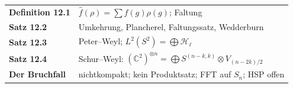\begin{merksatz}
\begin{center}
\renewcommand{\arraystretch}{1.5}
\begin{tabular}{@{}P{3.0cm}P{5.6cm}@{}}
\toprule
\textbf{Definition 12.1} & $\hat f(\rho) = \sum f(g)\rho(g)$; Faltung\\
\textbf{Satz 12.2} & Umkehrung, Plancherel, Faltungssatz, Wedderburn\\
\textbf{Satz 12.3} & Peter--Weyl; $L^{2}(S^{2}) = \bigoplus\mathcal H_\ell$\\
\textbf{Satz 12.4} & Schur--Weyl: $(\mathbb C^{2})^{\otimes n} = \bigoplus S^{(n-k,k)}\otimes V_{(n-2k)/2}$\\
\textbf{Der Bruchfall} & nichtkompakt; kein Produktsatz; FFT auf $S_n$; HSP offen\\
\bottomrule
\end{tabular}
\end{center}

\begin{center}
\begin{minipage}{0.88\textwidth}
\end{minipage}
\end{center}
\end{merksatz}
